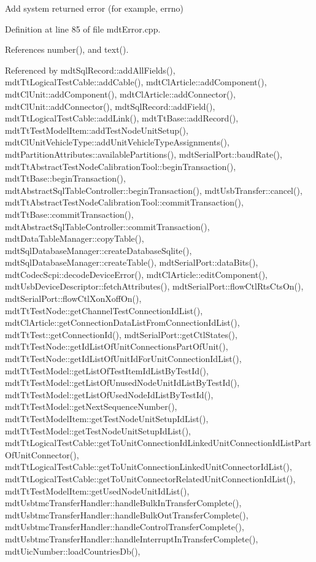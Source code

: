 Add system returned error (for example, errno) 



Definition at line 85 of file mdt\-Error.\-cpp.



References number(), and text().



Referenced by mdt\-Sql\-Record\-::add\-All\-Fields(), mdt\-Tt\-Logical\-Test\-Cable\-::add\-Cable(), mdt\-Cl\-Article\-::add\-Component(), mdt\-Cl\-Unit\-::add\-Component(), mdt\-Cl\-Article\-::add\-Connector(), mdt\-Cl\-Unit\-::add\-Connector(), mdt\-Sql\-Record\-::add\-Field(), mdt\-Tt\-Logical\-Test\-Cable\-::add\-Link(), mdt\-Tt\-Base\-::add\-Record(), mdt\-Tt\-Test\-Model\-Item\-::add\-Test\-Node\-Unit\-Setup(), mdt\-Cl\-Unit\-Vehicle\-Type\-::add\-Unit\-Vehicle\-Type\-Assignments(), mdt\-Partition\-Attributes\-::available\-Partitions(), mdt\-Serial\-Port\-::baud\-Rate(), mdt\-Tt\-Abstract\-Test\-Node\-Calibration\-Tool\-::begin\-Transaction(), mdt\-Tt\-Base\-::begin\-Transaction(), mdt\-Abstract\-Sql\-Table\-Controller\-::begin\-Transaction(), mdt\-Usb\-Transfer\-::cancel(), mdt\-Tt\-Abstract\-Test\-Node\-Calibration\-Tool\-::commit\-Transaction(), mdt\-Tt\-Base\-::commit\-Transaction(), mdt\-Abstract\-Sql\-Table\-Controller\-::commit\-Transaction(), mdt\-Data\-Table\-Manager\-::copy\-Table(), mdt\-Sql\-Database\-Manager\-::create\-Database\-Sqlite(), mdt\-Sql\-Database\-Manager\-::create\-Table(), mdt\-Serial\-Port\-::data\-Bits(), mdt\-Codec\-Scpi\-::decode\-Device\-Error(), mdt\-Cl\-Article\-::edit\-Component(), mdt\-Usb\-Device\-Descriptor\-::fetch\-Attributes(), mdt\-Serial\-Port\-::flow\-Ctl\-Rts\-Cts\-On(), mdt\-Serial\-Port\-::flow\-Ctl\-Xon\-Xoff\-On(), mdt\-Tt\-Test\-Node\-::get\-Channel\-Test\-Connection\-Id\-List(), mdt\-Cl\-Article\-::get\-Connection\-Data\-List\-From\-Connection\-Id\-List(), mdt\-Tt\-Test\-::get\-Connection\-Id(), mdt\-Serial\-Port\-::get\-Ctl\-States(), mdt\-Tt\-Test\-Node\-::get\-Id\-List\-Of\-Unit\-Connections\-Part\-Of\-Unit(), mdt\-Tt\-Test\-Node\-::get\-Id\-List\-Of\-Unit\-Id\-For\-Unit\-Connection\-Id\-List(), mdt\-Tt\-Test\-Model\-::get\-List\-Of\-Test\-Item\-Id\-List\-By\-Test\-Id(), mdt\-Tt\-Test\-Model\-::get\-List\-Of\-Unused\-Node\-Unit\-Id\-List\-By\-Test\-Id(), mdt\-Tt\-Test\-Model\-::get\-List\-Of\-Used\-Node\-Id\-List\-By\-Test\-Id(), mdt\-Tt\-Test\-Model\-::get\-Next\-Sequence\-Number(), mdt\-Tt\-Test\-Model\-Item\-::get\-Test\-Node\-Unit\-Setup\-Id\-List(), mdt\-Tt\-Test\-Model\-::get\-Test\-Node\-Unit\-Setup\-Id\-List(), mdt\-Tt\-Logical\-Test\-Cable\-::get\-To\-Unit\-Connection\-Id\-Linked\-Unit\-Connection\-Id\-List\-Part\-Of\-Unit\-Connector(), mdt\-Tt\-Logical\-Test\-Cable\-::get\-To\-Unit\-Connection\-Linked\-Unit\-Connector\-Id\-List(), mdt\-Tt\-Logical\-Test\-Cable\-::get\-To\-Unit\-Connector\-Related\-Unit\-Connection\-Id\-List(), mdt\-Tt\-Test\-Model\-Item\-::get\-Used\-Node\-Unit\-Id\-List(), mdt\-Usbtmc\-Transfer\-Handler\-::handle\-Bulk\-In\-Transfer\-Complete(), mdt\-Usbtmc\-Transfer\-Handler\-::handle\-Bulk\-Out\-Transfer\-Complete(), mdt\-Usbtmc\-Transfer\-Handler\-::handle\-Control\-Transfer\-Complete(), mdt\-Usbtmc\-Transfer\-Handler\-::handle\-Interrupt\-In\-Transfer\-Complete(), mdt\-Uic\-Number\-::load\-Countries\-Db(), 